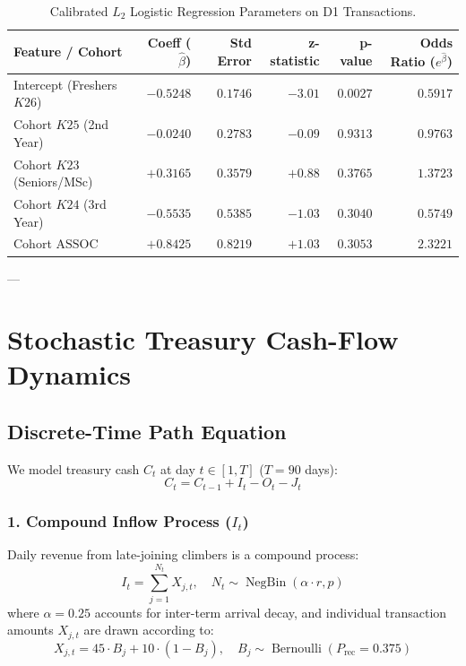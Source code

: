 \documentclass[11pt,a4paper]{article}
\begin{document}
\begin{table}[h]
\centering
\small
\begin{tabular}{lrrrrr}
\toprule
\textbf{Feature / Cohort} & \textbf{Coeff ($\hat{\beta}$)} & \textbf{Std Error} & \textbf{z-statistic} & \textbf{p-value} & \textbf{Odds Ratio ($e^{\hat{\beta}}$)} \\
\midrule
Intercept (Freshers $K26$) & $-0.5248$ & $0.1746$ & $-3.01$ & $0.0027$ & $0.5917$ \\
Cohort $K25$ (2nd Year)    & $-0.0240$ & $0.2783$ & $-0.09$ & $0.9313$ & $0.9763$ \\
Cohort $K23$ (Seniors/MSc) & $+0.3165$ & $0.3579$ & $+0.88$ & $0.3765$ & $1.3723$ \\
Cohort $K24$ (3rd Year)    & $-0.5535$ & $0.5385$ & $-1.03$ & $0.3040$ & $0.5749$ \\
Cohort $\text{ASSOC}$      & $+0.8425$ & $0.8219$ & $+1.03$ & $0.3053$ & $2.3221$ \\
\bottomrule
\end{tabular}
\caption{Calibrated $L_2$ Logistic Regression Parameters on D1 Transactions.}
\label{tab:coefficients}
\end{table}

---

\section{Stochastic Treasury Cash-Flow Dynamics}

\subsection{Discrete-Time Path Equation}
We model treasury cash $C_t$ at day $t \in [1, T]$ ($T = 90$ days):
\begin{equation}
C_t = C_{t-1} + I_t - O_t - J_t
\end{equation}

\subsubsection{1. Compound Inflow Process ($I_t$)}
Daily revenue from late-joining climbers is a compound process:
\begin{equation}
I_t = \sum_{j=1}^{N_t} X_{j, t}, \quad N_t \sim \operatorname{NegBin}(\alpha \cdot r, p)
\end{equation}
where $\alpha = 0.25$ accounts for inter-term arrival decay, and individual transaction amounts $X_{j, t}$ are drawn according to:
\begin{equation}
X_{j, t} = 45 \cdot B_j + 10 \cdot (1 - B_j), \quad B_j \sim \operatorname{Bernoulli}(P_{\text{rec}} = 0.375)
\end{equation}
\end{document}
